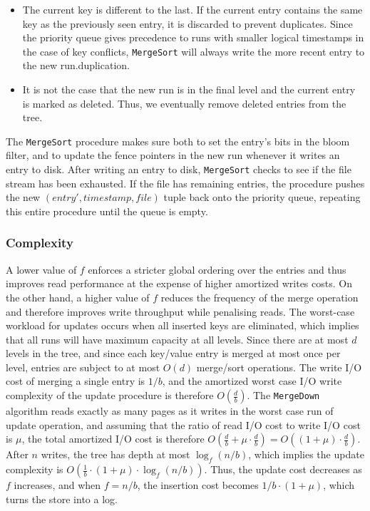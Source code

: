 \documentclass{acm}
\begin{document}
\begin{itemize}
  \item The current key is different to the last. If the current entry contains the same key as the previously seen entry, it is discarded to prevent duplicates. Since the priority queue gives precedence to runs with smaller logical timestamps in the case of key conflicts, \texttt{MergeSort} will always write the more recent entry to the new run.duplication.
  \item It is not the case that the new run is in the final level and the current entry is marked as deleted. Thus, we eventually remove deleted entries from the tree.
\end{itemize}

The \texttt{MergeSort} procedure makes sure both to set the entry's bits in the bloom filter, and to update the fence pointers in the new run whenever it writes an entry to disk. After writing an entry to disk, \texttt{MergeSort} checks to see if the file stream has been exhausted. If the file has remaining entries, the procedure pushes the new $(entry', timestamp, file)$ tuple back onto the priority queue, repeating this entire procedure until the queue is empty.

\subsubsection{Complexity}

A lower value of $f$ enforces a stricter global ordering over the entries and thus improves read performance at the expense of higher amortized writes costs. On the other hand, a higher value of $f$ reduces the frequency of the merge operation and therefore improves write throughput while penalising reads. The worst-case workload for updates occurs when all inserted keys are eliminated, which implies that all runs will have maximum capacity at all levels. Since there are at most $d$ levels in the tree, and since each key/value entry is merged at most once per level, entries are subject to at most $O(d)$ merge/sort operations. The write I/O cost of merging a single entry is $1/b$, and the amortized worst case I/O write complexity of the update procedure is therefore $O(\frac{d}{b})$. The \texttt{MergeDown} algorithm reads exactly as many pages as it writes in the worst case run of update operation, and assuming that the ratio of read I/O cost to write I/O cost is $\mu$, the total amortized I/O cost is therefore $O(\frac{d}{b} + \mu \cdot \frac{d}{b}) = O((1 + \mu) \cdot \frac{d}{b})$. After $n$ writes, the tree has depth at most $\log_f(n/b)$, which implies the update complexity is $O(\frac{1}{b} \cdot (1 + \mu) \cdot \log_f(n/b))$. Thus, the update cost decreases as $f$ increases, and when $f=n/b$, the insertion cost becomes $1/b \cdot (1 + \mu)$, which turns the store into a log.
\end{document}
